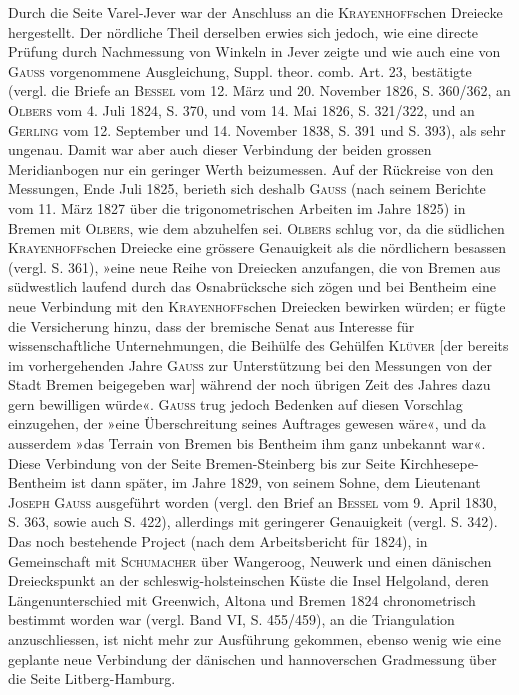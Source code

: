 \par\noindent\hspace*{\parindent}Durch die Seite Varel-Jever war der Anschluss an die \textsc{Krayenhoff}schen Dreiecke hergestellt. Der nördliche Theil derselben erwies sich jedoch, wie eine directe Prüfung durch Nachmessung von Winkeln in Jever zeigte und wie auch eine von \textsc{Gauss} vorgenommene Ausgleichung, Suppl. theor. comb. Art. 23, bestätigte (vergl. die Briefe an \textsc{Bessel} vom 12. März und 20. November 1826, S. 360/362, an \textsc{Olbers} vom 4. Juli 1824, S. 370, und vom 14. Mai 1826, S. 321/322, und an \textsc{Gerling} vom 12. September und 14. November 1838, S. 391 und S. 393), als sehr ungenau. Damit war aber auch dieser Verbindung der beiden grossen Meridianbogen nur ein geringer Werth beizumessen. Auf der Rückreise von den Messungen, Ende Juli 1825, berieth sich deshalb \textsc{Gauss} (nach seinem Berichte vom 11. März 1827 über die trigonometrischen Arbeiten im Jahre 1825) in Bremen mit \textsc{Olbers}, wie dem abzuhelfen sei. \textsc{Olbers} schlug vor, da die südlichen \textsc{Krayenhoff}schen Dreiecke eine grössere Genauigkeit als die nördlichern besassen (vergl. S. 361), »eine neue Reihe von Dreiecken anzufangen, die von Bremen aus südwestlich laufend durch das Osnabrücksche sich zögen und bei Bentheim eine neue Verbindung mit den \textsc{Krayenhoff}schen Dreiecken bewirken würden; er fügte die Versicherung hinzu, dass der bremische Senat aus Interesse für wissenschaftliche Unternehmungen, die Beihülfe des Gehülfen \textsc{Klüver} [der bereits im vorhergehenden Jahre \textsc{Gauss} zur Unterstützung bei den Messungen von der Stadt Bremen beigegeben war] während der noch übrigen Zeit des Jahres dazu gern bewilligen würde«. \textsc{Gauss} trug jedoch Bedenken auf diesen Vorschlag einzugehen, der »eine Überschreitung seines Auftrages gewesen wäre«, und da ausserdem »das Terrain von Bremen bis Bentheim ihm ganz unbekannt war«. Diese Verbindung von der Seite Bremen-Steinberg bis zur Seite Kirchhesepe-Bentheim ist dann später, im Jahre 1829, von seinem Sohne, dem Lieutenant \textsc{Joseph Gauss} ausgeführt worden (vergl. den Brief an \textsc{Bessel} vom 9. April 1830, S. 363, sowie auch S. 422), allerdings mit geringerer Genauigkeit (vergl. S. 342). Das noch bestehende Project (nach dem Arbeitsbericht für 1824), in Gemeinschaft mit \textsc{Schumacher} über Wangeroog, Neuwerk und einen dänischen Dreieckspunkt an der schleswig-holsteinschen Küste die Insel Helgoland, deren Längenunterschied mit Greenwich, Altona und Bremen 1824 chronometrisch bestimmt worden war (vergl. Band VI, S. 455/459), an die Triangulation anzuschliessen, ist nicht mehr zur Ausführung gekommen, ebenso wenig wie eine geplante neue Verbindung der dänischen und hannoverschen Gradmessung über die Seite Litberg-Hamburg.

